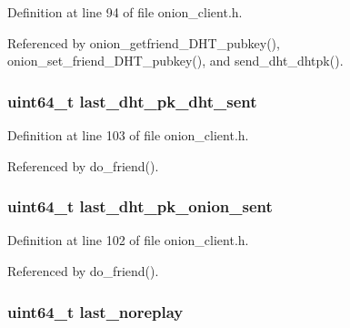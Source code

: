 Definition at line 94 of file onion\+\_\+client.\+h.



Referenced by onion\+\_\+getfriend\+\_\+\+D\+H\+T\+\_\+pubkey(), onion\+\_\+set\+\_\+friend\+\_\+\+D\+H\+T\+\_\+pubkey(), and send\+\_\+dht\+\_\+dhtpk().

\hypertarget{struct_onion___friend_a412168e37e1bdf5545f814c9c487aaeb}{
\subsubsection[{last\+\_\+dht\+\_\+pk\+\_\+dht\+\_\+sent}]{\setlength{\rightskip}{0pt plus 5cm}uint64\+\_\+t last\+\_\+dht\+\_\+pk\+\_\+dht\+\_\+sent}}\label{struct_onion___friend_a412168e37e1bdf5545f814c9c487aaeb}


Definition at line 103 of file onion\+\_\+client.\+h.



Referenced by do\+\_\+friend().

\hypertarget{struct_onion___friend_ac83f72b06d86503ee29943ccbe7f1a7a}{
\subsubsection[{last\+\_\+dht\+\_\+pk\+\_\+onion\+\_\+sent}]{\setlength{\rightskip}{0pt plus 5cm}uint64\+\_\+t last\+\_\+dht\+\_\+pk\+\_\+onion\+\_\+sent}}\label{struct_onion___friend_ac83f72b06d86503ee29943ccbe7f1a7a}


Definition at line 102 of file onion\+\_\+client.\+h.



Referenced by do\+\_\+friend().

\hypertarget{struct_onion___friend_afeea50a96c079a530de60cf6389ec1bd}{
\subsubsection[{last\+\_\+noreplay}]{\setlength{\rightskip}{0pt plus 5cm}uint64\+\_\+t last\+\_\+noreplay}}\label{struct_onion___friend_afeea50a96c079a530de60cf6389ec1bd}


